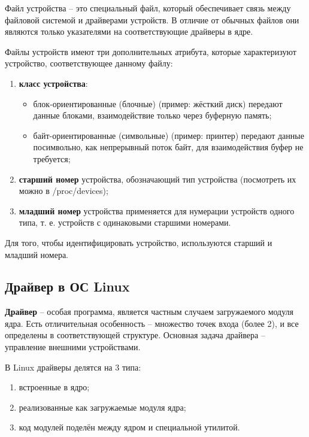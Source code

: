 Файл устройства -- это специальный файл, который обеспечивает связь между файловой системой и драйверами устройств. В отличие от обычных файлов они являются только указателями на соответствующие драйверы в ядре.

Файлы устройств имеют три дополнительных атрибута, которые характеризуют устройство, соответствующее данному файлу:
\begin{enumerate}
	\item \textbf{класс устройства}:
	\begin{itemize}
		\item блок-ориентированные (блочные) (пример: жёсткий диск) передают данные блоками, взаимодействие только через буферную память;
		\item байт-ориентированные (символьные) (пример: принтер) передают данные посимвольно, как непрерывный поток байт, для взаимодействия буфер не требуется;
	\end{itemize}

	\item \textbf{старший номер} устройства, обозначающий тип устройства (посмотреть их можно в /proc/devices);
	
	\item \textbf{младший номер} устройства применяется для нумерации устройств одного типа, т. е. устройств с одинаковыми старшими номерами.
\end{enumerate}

Для того, чтобы идентифицировать устройство, используются старший и младший номера. \cite{os} \newline

\subsection{Драйвер в ОС Linux}
\textbf{Драйвер} -- особая программа, является частным случаем загружаемого модуля ядра.  Есть отличительная особенность -- множество точек входа (более 2), и все определены в соответствующей структуре. Основная задача драйвера -- управление внешними устройствами. \cite{os}

В Linux драйверы делятся на 3 типа:
\begin{enumerate}
	\item встроенные в ядро;
	
	\item реализованные как загружаемые модуля ядра;
	
	\item код модулей поделён между ядром и специальной утилитой.
\end{enumerate}

